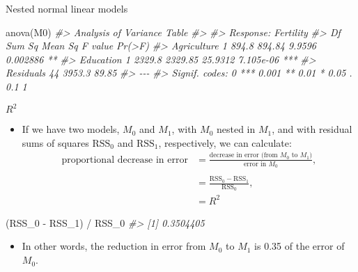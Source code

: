 \documentclass[
  10pt,
  ignorenonframetext,
]{beamer}
\newenvironment{Shaded}{\begin{snugshade}}{\end{snugshade}}
\newcommand{\CommentTok}[1]{\textcolor[rgb]{0.56,0.35,0.01}{\textit{#1}}}
\newcommand{\FunctionTok}[1]{\textcolor[rgb]{0.00,0.00,0.00}{#1}}
\newcommand{\NormalTok}[1]{#1}
\newcommand{\SpecialCharTok}[1]{\textcolor[rgb]{0.00,0.00,0.00}{#1}}
\providecommand{\tightlist}{%
  \setlength{\itemsep}{0pt}\setlength{\parskip}{0pt}}
\begin{document}
\begin{frame}[fragile]{Nested normal linear models}
\protect\hypertarget{nested-normal-linear-models-8}{}
\begin{Shaded}
\begin{Highlighting}[]
\FunctionTok{anova}\NormalTok{(M0)}
\CommentTok{\#\textgreater{} Analysis of Variance Table}
\CommentTok{\#\textgreater{} }
\CommentTok{\#\textgreater{} Response: Fertility}
\CommentTok{\#\textgreater{}             Df Sum Sq Mean Sq F value    Pr(\textgreater{}F)    }
\CommentTok{\#\textgreater{} Agriculture  1  894.8  894.84  9.9596  0.002886 ** }
\CommentTok{\#\textgreater{} Education    1 2329.8 2329.85 25.9312 7.105e{-}06 ***}
\CommentTok{\#\textgreater{} Residuals   44 3953.3   89.85                      }
\CommentTok{\#\textgreater{} {-}{-}{-}}
\CommentTok{\#\textgreater{} Signif. codes:  0 \textquotesingle{}***\textquotesingle{} 0.001 \textquotesingle{}**\textquotesingle{} 0.01 \textquotesingle{}*\textquotesingle{} 0.05 \textquotesingle{}.\textquotesingle{} 0.1 \textquotesingle{} \textquotesingle{} 1}
\end{Highlighting}
\end{Shaded}
\end{frame}

\begin{frame}[fragile]{\(R^2\)}
\protect\hypertarget{r2}{}
\begin{itemize}
\tightlist
\item
  If we have two models, \(M_0\) and \(M_1\), with \(M_0\) nested in
  \(M_1\), and with residual sums of squares \(\text{RSS}_0\) and
  \(\text{RSS}_1\), respectively, we can calculate: \[
  \begin{aligned}
  \text{proportional decrease in error}&= \frac{\text{decrease in error (from $M_0$ to $M_1$)}}{\text{error in $M_0$}} ,\\
  \\
  &= \frac{\text{RSS}_0 - \text{RSS}_1}{\text{RSS}_0},\\
  & = R^2
  \end{aligned}
  \]
\end{itemize}

\begin{Shaded}
\begin{Highlighting}[]
\NormalTok{(RSS\_0 }\SpecialCharTok{{-}}\NormalTok{ RSS\_1) }\SpecialCharTok{/}\NormalTok{ RSS\_0}
\CommentTok{\#\textgreater{} [1] 0.3504405}
\end{Highlighting}
\end{Shaded}

\begin{itemize}
\tightlist
\item
  In other words, the reduction in error from \(M_0\) to \(M_1\) is 0.35
  of the error of \(M_0\).
\end{itemize}
\end{frame}
\end{document}
